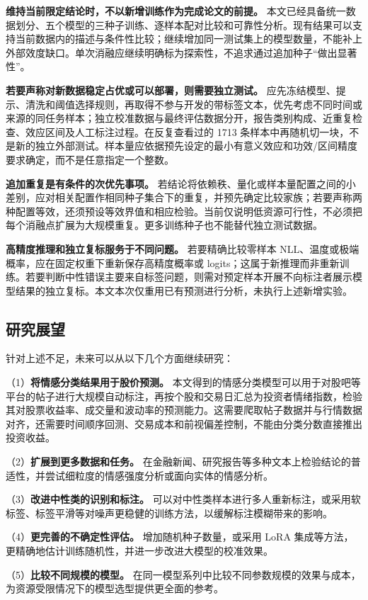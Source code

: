 \textbf{维持当前限定结论时，不以新增训练作为完成论文的前提。} 本文已经具备统一数据划分、五个模型的三种子训练、逐样本配对比较和可靠性分析。现有结果可以支持当前数据内的描述与条件性比较；继续增加同一测试集上的模型数量，不能补上外部效度缺口。单次消融应继续明确标为探索性，不追求通过追加种子``做出显著性''。

\textbf{若要声称对新数据稳定占优或可以部署，则需要独立测试。} 应先冻结模型、提示、清洗和阈值选择规则，再取得不参与开发的带标签文本，优先考虑不同时间或来源的同任务样本；独立校准数据与最终评估数据分开，报告类别构成、近重复检查、效应区间及人工标注过程。在反复查看过的 1713 条样本中再随机切一块，不是新的独立外部测试。样本量应依据预先设定的最小有意义效应和功效/区间精度要求确定，而不是任意指定一个整数。

\textbf{追加重复是有条件的次优先事项。} 若结论将依赖秩、量化或样本量配置之间的小差别，应对相关配置作相同种子集合下的重复，并预先确定比较家族；若要声称两种配置等效，还须预设等效界值和相应检验。当前仅说明低资源可行性，不必须把每个消融点扩展为大规模重复。更多训练种子也不能替代独立测试数据。

\textbf{高精度推理和独立复标服务于不同问题。} 若要精确比较零样本 NLL、温度或极端概率，应在固定权重下重新保存高精度概率或 logits；这属于新推理而非重新训练。若要判断中性错误主要来自标签问题，则需对预定样本开展不向标注者展示模型结果的独立复标。本文本次仅重用已有预测进行分析，未执行上述新增实验。

\FloatBarrier\subsection{研究展望}

针对上述不足，未来可以从以下几个方面继续研究：

（1）\textbf{将情感分类结果用于股价预测。} 本文得到的情感分类模型可以用于对股吧等平台的帖子进行大规模自动标注，再按个股和交易日汇总为投资者情绪指数，检验其对股票收益率、成交量和波动率的预测能力。这需要爬取帖子数据并与行情数据对齐，还需要时间顺序回测、交易成本和前视偏差控制，不能由分类分数直接推出投资收益。

（2）\textbf{扩展到更多数据和任务。} 在金融新闻、研究报告等多种文本上检验结论的普适性，并尝试细粒度的情感强度分析或面向实体的情感分析。

（3）\textbf{改进中性类的识别和标注。} 可以对中性类样本进行多人重新标注，或采用软标签、标签平滑等对噪声更稳健的训练方法，以缓解标注模糊带来的影响。

（4）\textbf{更完善的不确定性评估。} 增加随机种子数量，或采用 LoRA 集成等方法，更精确地估计训练随机性，并进一步改进大模型的校准效果。

（5）\textbf{比较不同规模的模型。} 在同一模型系列中比较不同参数规模的效果与成本，为资源受限情况下的模型选型提供更全面的参考。
